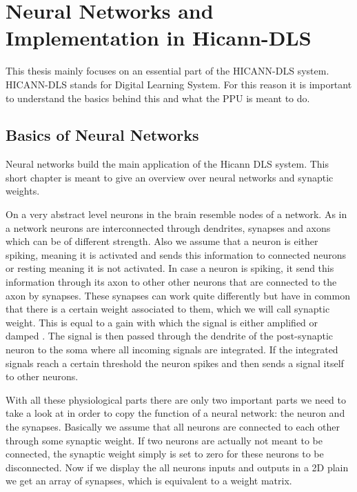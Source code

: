 \chapter{Neural Networks and Implementation in Hicann-DLS}
\label{chapter:networks}

This thesis mainly focuses on an essential part of the HICANN-DLS system.
HICANN-DLS stands for  Digital Learning System.
For this reason it is important to understand the basics behind this and what the PPU is meant to do.

\section{Basics of Neural Networks}
Neural networks build the main application of the Hicann DLS system. This short chapter is meant to give an overview over neural networks and synaptic weights.

On a very abstract level neurons in the brain resemble nodes of a network.
As in a network neurons are interconnected through dendrites, synapses and axons which can be of different strength. 
Also we assume that a neuron is either spiking, meaning it is activated and sends this information to connected neurons or resting meaning it is not activated.
In case a neuron is spiking, it send this information through its axon to other other neurons that are connected to the axon by synapses.
These synapses can work quite differently but have in common that there is a certain weight associated to them, which we will call synaptic weight.
This is equal to a gain with which the signal is either amplified or damped .
The signal is then passed through the dendrite of the post-synaptic neuron to the soma where all incoming signals are integrated.
If the integrated signals reach a certain threshold the neuron spikes and then sends a signal itself to other neurons.

With all these physiological parts there are only two important parts we need to take a look at in order to copy the function of a neural network: the neuron and the synapses.
Basically we assume that all neurons are connected to each other through some synaptic weight.
If two neurons are actually not meant to be connected, the synaptic weight simply is set to zero for these neurons to be disconnected.
Now if we display the all neurons inputs and outputs in a 2D plain we get an array of synapses, which is equivalent to a weight matrix.

